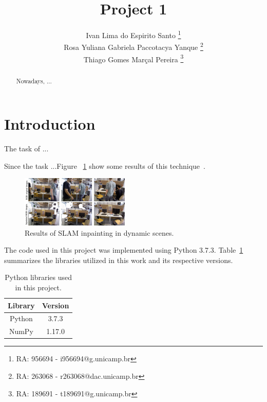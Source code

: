 \documentclass[]{IEEEtran}
\begin{document}
\title{Project 1 }
\author{Ivan Lima do Espirito Santo \thanks{RA: 956694 - i956694@g.unicamp.br}\\ Rosa Yuliana Gabriela Paccotacya Yanque \thanks{RA: 263068 - r263068@dac.unicamp.br} \\ Thiago Gomes Marçal Pereira \thanks{RA: 189691 - t189691@g.unicamp.br}}


\maketitle
  
\begin{abstract}

Nowadays, ...

\end{abstract}
  
\section{Introduction}
\label{sec:introduction}

The task of ...

Since the task ...Figure ~\ref{fig:slam} show some results of this technique~\cite{Zivkovic2004ImprovedAG}.


\begin{figure}[!ht]
  \centering
  \includegraphics[width=0.46\textwidth]{images/SLAM.png}
  \caption{Results of SLAM inpainting in dynamic scenes.}
  \label{fig:slam}
\end{figure}

The code used in this project was implemented using Python 3.7.3. Table~\ref{tab:software} summarizes the libraries utilized in this work and its respective versions.

\renewcommand{\arraystretch}{1.2}
\begin{table}[h]
    \begin{center}
        \small
        \begin{tabular}{| c | c |} 
            \hline
            \textbf{Library} & \textbf{Version}\\ 
            \hline \hline
            Python & 3.7.3 \\  
            \hline
            NumPy & 1.17.0 \\  
            \hline
        \end{tabular}
    \caption{Python libraries used in this project.}
    \label{tab:software}
    \end{center}
\end{table}
\end{document}
